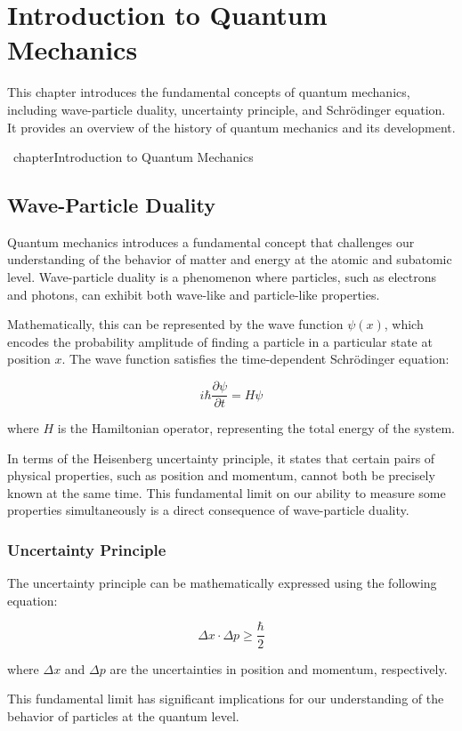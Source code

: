 \documentclass{report}%
\begin{document}
\chapter{Introduction to Quantum Mechanics}%
This chapter introduces the fundamental concepts of quantum mechanics, including wave-particle duality, uncertainty principle, and Schrödinger equation. It provides an overview of the history of quantum mechanics and its development.

%
\ chapter{Introduction to Quantum Mechanics}

\section*{Wave-Particle Duality}

Quantum mechanics introduces a fundamental concept that challenges our understanding of the behavior of matter and energy at the atomic and subatomic level. Wave-particle duality is a phenomenon where particles, such as electrons and photons, can exhibit both wave-like and particle-like properties.

Mathematically, this can be represented by the wave function $\psi(x)$, which encodes the probability amplitude of finding a particle in a particular state at position $x$. The wave function satisfies the time-dependent Schrödinger equation:

\[
i\hbar \frac{\partial \psi}{\partial t} = H \psi
\]

where $H$ is the Hamiltonian operator, representing the total energy of the system.

In terms of the Heisenberg uncertainty principle, it states that certain pairs of physical properties, such as position and momentum, cannot both be precisely known at the same time. This fundamental limit on our ability to measure some properties simultaneously is a direct consequence of wave-particle duality.

\subsection*{Uncertainty Principle}

The uncertainty principle can be mathematically expressed using the following equation:

\[
\Delta x \cdot \Delta p \geq \frac{\hbar}{2}
\]

where $\Delta x$ and $\Delta p$ are the uncertainties in position and momentum, respectively.

This fundamental limit has significant implications for our understanding of the behavior of particles at the quantum level.
\end{document}
